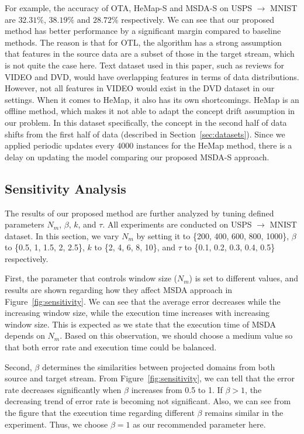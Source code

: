 For example, the accuracy of OTA, HeMap-S and MSDA-S on USPS $\rightarrow$ MNIST are $32.31\%$, $38.19\%$ and $28.72\%$ respectively. 
We can see that our proposed method has better performance by a significant margin compared to baseline methods. The reason is that for OTL, the algorithm has a strong assumption that features in the source data are a subset of those in the target stream, which is not quite the case here.  
Text dataset used in this paper, such as reviews for VIDEO and DVD, would have overlapping features in terms of data distributions. However, not all features in VIDEO would exist in the DVD dataset in our settings. 
When it comes to HeMap, it also has its own shortcomings. HeMap is an offline method, which makes it not able to adapt the concept drift assumption in our problem. In this dataset specifically, the concept in the second half of data shifts from the first half of data (described in Section~\ref{sec:datasets}). Since we applied periodic updates every 4000 instances for the HeMap method, there is a delay on updating the model comparing our proposed MSDA-S approach.

\subsection{Sensitivity Analysis}
The results of our proposed method are further analyzed by tuning defined parameters $N_m$, $\beta$, $k$, and $\tau$. All experiments are conducted on USPS $\rightarrow$ MNIST dataset. In this section, we vary $N_m$ by setting it to \{200, 400, 600, 800, 1000\}, $\beta$ to \{0.5, 1, 1.5, 2, 2.5\},
$k$ to \{2, 4, 6, 8, 10\}, and  $\tau$ to \{0.1, 0.2, 0.3, 0.4, 0.5\} respectively.

First, the parameter that controls window size ($N_m$) is set to different values, and results are shown regarding how they affect MSDA approach in Figure~\ref{fig:sensitivity}. We can see that the average error decreases while the increasing window size, while the execution time increases with increasing window size. This is expected as we state that the execution time of MSDA depends on $N_m$. Based on this observation, we should choose a medium value so that both error rate and execution time could be balanced.

Second, $\beta$ determines the similarities between projected domains from both source and target stream. From Figure~\ref{fig:sensitivity}, we can tell that the error rate decreases significantly when $\beta$ increases from 0.5 to 1. If $\beta > 1$, the decreasing trend of error rate is becoming not significant. Also, we can see from the figure that the execution time regarding different $\beta$ remains similar in the experiment. Thus, we choose $\beta = 1$ as our recommended parameter here.

